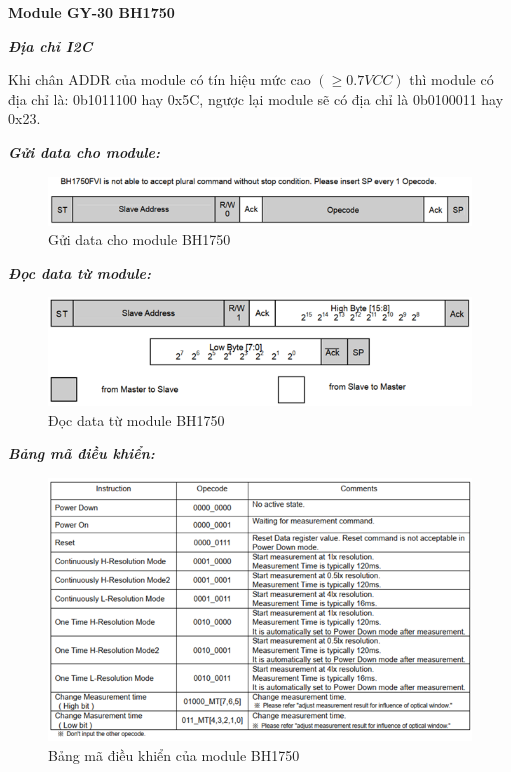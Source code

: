 \textbf{Module GY-30 BH1750}

\textbf{\textit{Địa chỉ I2C}}

Khi chân ADDR của module có tín hiệu mức cao $(\geq 0.7VCC)$ thì module có địa chỉ là: 0b1011100 hay 0x5C, ngược lại module sẽ có địa chỉ là 0b0100011 hay 0x23.

\textbf{\textit{Gửi data cho module:}}
\begin{figure}[H]
	\centering
	\includegraphics[scale=0.9]{Chapters/Chapter5/Images/SendDataGY30.png}
	\caption{Gửi data cho module BH1750}
	\label{fig:C5SendDataGY30}
\end{figure}

\textbf{\textit{Đọc data từ module:}}
\begin{figure}[H]
	\centering
	\includegraphics[scale=0.9]{Chapters/Chapter5/Images/ReadDataGY30.png}
	\caption{Đọc data từ module BH1750}
	\label{fig:C5ReadDataGY30}
\end{figure}

\textbf{\textit{Bảng mã điều khiển:}}
\begin{figure}[H]
	\centering
	\includegraphics[scale=0.9]{Chapters/Chapter5/Images/OpecodeGY30.png}
	\caption{Bảng mã điều khiển của module BH1750}
	\label{fig:C5OpecodeGY30}
\end{figure}

